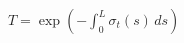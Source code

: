 \documentclass[border=6pt]{standalone}
\begin{document}
\color{white}
\(\displaystyle
T = \exp\!\left(-\int_0^L \sigma_t(s)\,ds\right)
\)
\end{document}
